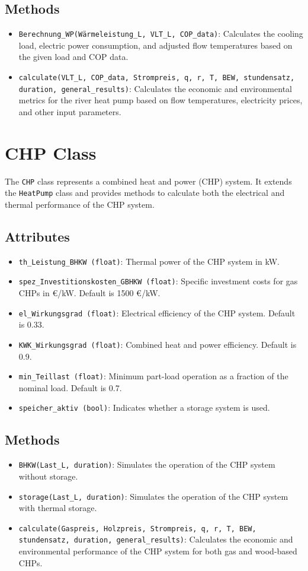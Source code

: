\subsection{Methods}
\begin{itemize}
    \item \texttt{Berechnung\_WP(Wärmeleistung\_L, VLT\_L, COP\_data)}: Calculates the cooling load, electric power consumption, and adjusted flow temperatures based on the given load and COP data.
    \item \texttt{calculate(VLT\_L, COP\_data, Strompreis, q, r, T, BEW, stundensatz, duration, general\_results)}: Calculates the economic and environmental metrics for the river heat pump based on flow temperatures, electricity prices, and other input parameters.
\end{itemize}

\section{CHP Class}
The \texttt{CHP} class represents a combined heat and power (CHP) system. It extends the \texttt{HeatPump} class and provides methods to calculate both the electrical and thermal performance of the CHP system.

\subsection{Attributes}
\begin{itemize}
    \item \texttt{th\_Leistung\_BHKW (float)}: Thermal power of the CHP system in kW.
    \item \texttt{spez\_Investitionskosten\_GBHKW (float)}: Specific investment costs for gas CHPs in €/kW. Default is 1500 €/kW.
    \item \texttt{el\_Wirkungsgrad (float)}: Electrical efficiency of the CHP system. Default is 0.33.
    \item \texttt{KWK\_Wirkungsgrad (float)}: Combined heat and power efficiency. Default is 0.9.
    \item \texttt{min\_Teillast (float)}: Minimum part-load operation as a fraction of the nominal load. Default is 0.7.
    \item \texttt{speicher\_aktiv (bool)}: Indicates whether a storage system is used.
\end{itemize}

\subsection{Methods}
\begin{itemize}
    \item \texttt{BHKW(Last\_L, duration)}: Simulates the operation of the CHP system without storage. 
    \item \texttt{storage(Last\_L, duration)}: Simulates the operation of the CHP system with thermal storage.
    \item \texttt{calculate(Gaspreis, Holzpreis, Strompreis, q, r, T, BEW, stundensatz, duration, general\_results)}: Calculates the economic and environmental performance of the CHP system for both gas and wood-based CHPs.
\end{itemize}
